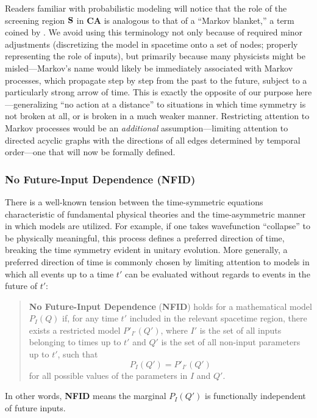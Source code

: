 \documentclass[onecolumn, nofootinbib, 12pt]{revtex4-1}
\begin{document}
Readers familiar with probabilistic modeling will notice that the role of the screening region $\bf{S}$ in {\bf CA} is analogous to that of a ``Markov blanket,'' a term coined by \textcite{pearl1988}.   We avoid using this terminology not only because of required minor adjustments (discretizing the model in spacetime onto a set of nodes; properly representing the role of inputs), but primarily because many physicists might be misled---Markov's name would likely be immediately associated with Markov processes, which propagate step by step from the past to the future, subject to a particularly strong arrow of time.  This is exactly the opposite of our purpose here---generalizing ``no action at a distance'' to situations in which time symmetry is not broken at all, or is broken in a much weaker manner.  Restricting attention to Markov processes would be an \emph{additional} assumption---limiting attention to directed acyclic graphs with the directions of all edges determined by temporal order---one that will now be formally defined. 

\subsubsection{No Future-Input Dependence {\rm ({\bf NFID})}}

There is a well-known tension between the time-symmetric equations characteristic of fundamental physical theories and the time-asymmetric manner in which models are utilized.  For example, if one takes wavefunction ``collapse'' to be physically meaningful, this process defines a preferred direction of time, breaking the time symmetry evident in unitary evolution.  More generally, a preferred direction of time is commonly chosen by limiting attention to models in which all events up to a time $t'$ can be evaluated without regards to events in the future of $t'$: 

\begin{quote}
{\bf No Future-Input Dependence} ({\bf NFID}) holds for a mathematical model $P_I(Q)$ if, for any time $t'$ included in the relevant spacetime region, there exists a restricted model $P'_{I'}(Q')$, where $I'$ is the set of all inputs belonging to times up to $t'$ and $Q'$ is the set of all non-input parameters up to $t'$, such that
\begin{equation}
\label{eq:NFID}
P_I(Q')=P'_{I'}(Q')
\end{equation}
for all possible values of the parameters in $I$ and $Q'$.  
\end{quote}
In other words, {\bf NFID} means the marginal $P_I(Q')$ is functionally independent of future inputs.
\end{document}
